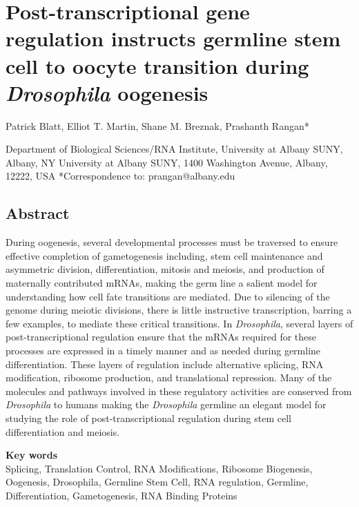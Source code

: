 \documentclass[12pt,oneside]{reedthesis}
\begin{document}
\hypertarget{post-transcriptional-gene-regulation-instructs-germline-stem-cell-to-oocyte-transition-during-drosophila-oogenesis}{%
\chapter{\texorpdfstring{Post-transcriptional gene regulation instructs germline stem cell to oocyte transition during \emph{Drosophila} oogenesis}{Post-transcriptional gene regulation instructs germline stem cell to oocyte transition during Drosophila oogenesis}}\label{post-transcriptional-gene-regulation-instructs-germline-stem-cell-to-oocyte-transition-during-drosophila-oogenesis}}

Patrick Blatt, Elliot T. Martin, Shane M. Breznak, Prashanth Rangan*

Department of Biological Sciences/RNA Institute, University at Albany
SUNY, Albany, NY
University at Albany SUNY, 1400 Washington Avenue, Albany, 12222, USA
*Correspondence to: prangan@albany.edu


\hypertarget{abstract}{%
\section{Abstract}\label{abstract}}

During oogenesis, several developmental processes must be traversed to
ensure effective completion of gametogenesis including, stem cell
maintenance and asymmetric division, differentiation, mitosis and
meiosis, and production of maternally contributed mRNAs, making the germ
line a salient model for understanding how cell fate transitions are
mediated. Due to silencing of the genome during meiotic divisions, there
is little instructive transcription, barring a few examples, to mediate
these critical transitions. In \emph{Drosophila}, several layers of
post-transcriptional regulation ensure that the mRNAs required for these
processes are expressed in a timely manner and as needed during germline
differentiation. These layers of regulation include alternative
splicing, RNA modification, ribosome production, and translational
repression. Many of the molecules and pathways involved in these
regulatory activities are conserved from \emph{Drosophila} to humans making
the \emph{Drosophila} germline an elegant model for studying the role of
post-transcriptional regulation during stem cell differentiation and
meiosis.

\textbf{Key words}\\
{Splicing, Translation Control, RNA Modifications, Ribosome Biogenesis,}\\
{Oogenesis, Drosophila, Germline Stem Cell, RNA regulation, Germline,}\\
{Differentiation, Gametogenesis, RNA Binding Proteins}\\
\end{document}
